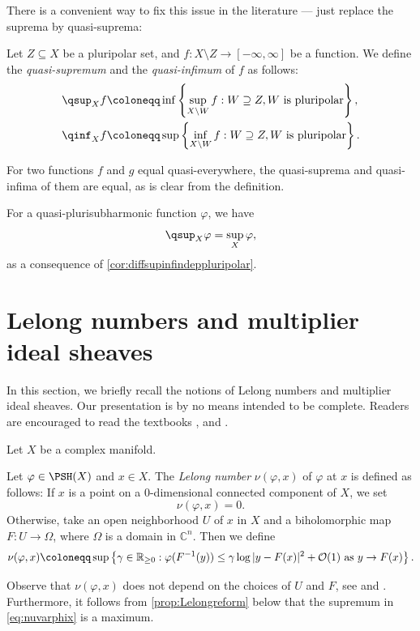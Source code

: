 There is a convenient way to fix this issue in the literature --- just replace the suprema by quasi-suprema:
\begin{definition}\label{def:quasi_sup}
    Let $Z\subseteq X$ be a pluripolar set, and $f\colon X\setminus Z\rightarrow [-\infty,\infty]$ be a function. We define the \emph{quasi-supremum} and the \emph{quasi-infimum} of $f$ as follows:
    \[
    \begin{split}
    \qsup_X f\coloneqq &\inf\left\{\sup_{X\setminus W} f:W\supseteq Z, W \textup{ is pluripolar}\right\},\\
    \qinf_X f\coloneqq &\sup\left\{\inf_{X\setminus W} f:W\supseteq Z, W \textup{ is pluripolar}\right\}.
    \end{split}
    \]
\end{definition}
For two functions $f$ and $g$ equal quasi-everywhere, the quasi-suprema and quasi-infima of them are equal, as is clear from the definition.

For a quasi-plurisubharmonic function $\varphi$, we have
\[
\qsup_X \varphi=\sup_X \varphi,
\]
as a consequence of \cref{cor:diffsupinfindeppluripolar}.

\section{Lelong numbers and multiplier ideal sheaves}\label{sec:Lelongmis}
In this section, we briefly recall the notions of Lelong numbers and multiplier ideal sheaves. Our presentation is by no means intended to be complete. Readers are encouraged to read the textbooks \cite[Section~2.3]{GZ17}, \cite{Dem12} and \cite[Chapter~12]{FPT}.

Let $X$ be a complex manifold.

\begin{definition}\label{def:pshfunctions:L1002}
    Let $\varphi\in \PSH(X)$ and $x\in X$. The \emph{Lelong number} $\nu(\varphi,x)$ of $\varphi$ at $x$ is defined as follows:
    If $x$ is a point on a $0$-dimensional connected component of $X$, we set
    \[
        \nu(\varphi,x)=0.
    \]
    Otherwise, take an open neighborhood $U$ of $x$ in $X$ and a biholomorphic map $F\colon U\rightarrow \Omega$, where $\Omega$ is a domain in $\mathbb{C}^n$. Then we define
    \begin{equation}\label{eq:nuvarphix}
    \nu(\varphi,x)\coloneqq \sup\left\{ \gamma\in \mathbb{R}_{\geq 0}: \varphi(F^{-1}(y))\leq \gamma \log|y-F(x)|^2+\mathcal{O}(1)\textup{ as }y\to F(x) \right\}.
    \end{equation}
\end{definition}
Observe that $\nu(\varphi,x)$ does not depend on the choices of $U$ and $F$, see \cite[Page~167, Corollary~7.2]{DemBook} and \cite[Proposition~12.1.1 and Definition~12.1.2]{FPT}.
Furthermore, it follows from \cref{prop:Lelongreform} below that the supremum in \eqref{eq:nuvarphix} is a maximum.


